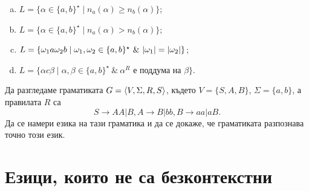 \begin{problem}
\begin{enumerate}[a)]
  \item
    $L = \{\alpha \in \{a,b\}^\star\mid n_a(\alpha) \geq n_b(\alpha)\}$;
  \item
    $L = \{\alpha \in \{a,b\}^\star\mid n_a(\alpha) > n_b(\alpha)\}$;
  \item
    $L = \{\omega_1 a \omega_2 b \mid \omega_1,\omega_2 \in \{a,b\}^\star\ \&\ \lvert{\omega_1}\rvert = \lvert{\omega_2}\rvert\}$;
  \item
    $L = \{\alpha c \beta \mid \alpha,\beta \in \{a,b\}^\star\ \&\ \alpha^R\mbox{ е поддума на }\beta \}$.
  \end{enumerate}
\end{problem}

\begin{problem}
  Да разгледаме граматиката $G = \langle{V,\Sigma,R,S}\rangle$, където  $V = \{S,A,B\}$, $\Sigma = \{a,b\}$, а правилата $R$ са
  \[S \to AA | B, A \to B | bb, B \to aa | aB.\]
  Да се намери езика на тази граматика и да се докаже, че граматиката разпознава точно този език.
\end{problem}



\section{Езици, които не са безконтекстни}

